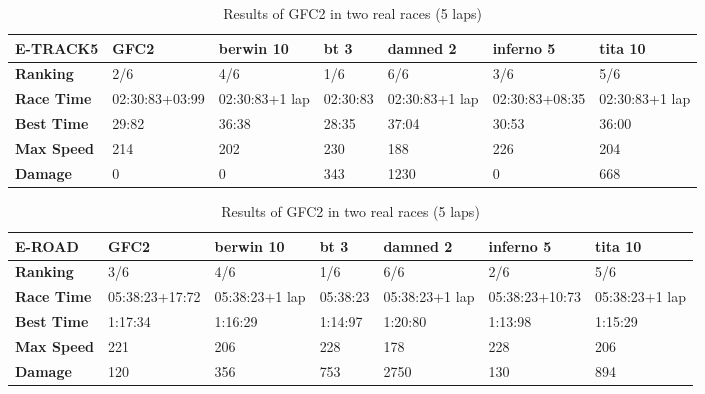 \documentclass[conference]{IEEEtran}
\begin{document}
\begin{table}[!ht]
	\centering
	{\scriptsize
		\caption{Results of GFC2 in two real races (5 laps)}
		\label{tab:gfc2real}
		\begin{tabular}{|p{2 cm}|p{1.5 cm}|p{1.5 cm}|p{1.5 cm}|p{1.5 cm}|p{1.5 cm}|p{1.5 cm}|}
			\hline \textbf{E-TRACK5} & \textbf{GFC2}&\textbf{berwin 10} & \textbf{bt 3} &\textbf{damned 2} & \textbf{inferno 5} & \textbf{tita 10}  \\
			\hline \textbf{Ranking} & 2/6&4/6&1/6&6/6&3/6&5/6\\			
			\hline \textbf{Race Time}	& 02:30:83\newline +03:99&  02:30:83\newline+1 lap&02:30:83&02:30:83\newline+1 lap&02:30:83\newline+08:35&02:30:83\newline+1 lap\\	
			\hline \textbf{Best Time}& 29:82 &36:38&28:35&37:04&30:53&36:00\\	
			\hline \textbf{Max Speed}& 214&202&230&188&226&204\\	
			\hline \textbf{Damage}& 0& 0 & 343&1230&0&668\\	
			\hline 
		\end{tabular}
		
		\begin{tabular}{|p{2 cm}|p{1.5 cm}|p{1.5 cm}|p{1.5 cm}|p{1.5 cm}|p{1.5 cm}|p{1.5 cm}|}
			\hline \textbf{E-ROAD} & \textbf{GFC2}&\textbf{berwin 10} & \textbf{bt 3} &\textbf{damned 2} & \textbf{inferno 5} & \textbf{tita 10}  \\
			\hline \textbf{Ranking} & 3/6&4/6&1/6&6/6&2/6&5/6\\			
			\hline \textbf{Race Time}	& 05:38:23\newline +17:72&  05:38:23\newline+1 lap&05:38:23&05:38:23\newline+1 lap&05:38:23\newline+10:73&05:38:23\newline+1 lap\\	
			\hline \textbf{Best Time}& 1:17:34 &1:16:29&1:14:97&1:20:80&1:13:98&1:15:29\\	
			\hline \textbf{Max Speed}& 221&206&228&178&228&206\\
			\hline \textbf{Damage}& 120& 356 & 753&2750&130&894\\	
			\hline 
		\end{tabular}
	}
\end{table}
\end{document}
